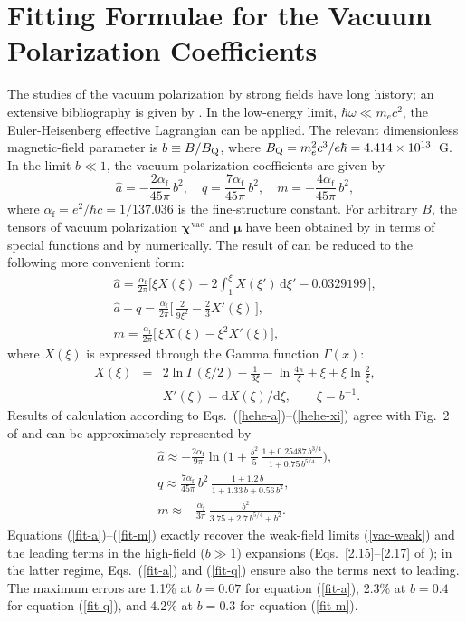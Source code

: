 \documentclass{emulateapj}
\newcommand{\beq}{\begin{equation}}
\newcommand{\eeq}{\end{equation}}
\newcommand{\bea}{\begin{eqnarray}}
\newcommand{\eea}{\end{eqnarray}}
\newcommand{\req}[1]{equation (\ref{#1})}
\newcommand{\dd}{\mathrm{d}}
\newcommand{\alphaf}{\alpha_\mathrm{f}}
\newcommand{\mel}{m_e}
\newcommand{\Bq}{B_{\rm Q}}
\begin{document}
\section{Fitting Formulae for the Vacuum Polarization Coefficients}
The studies of the vacuum polarization by strong fields have long
history; an extensive bibliography is given by \citet{Schubert}. In the
low-energy limit, $\hbar\omega\ll\mel c^2$, 
the Euler-Heisenberg effective Lagrangian can be
applied. The relevant dimensionless magnetic-field parameter is
 $b\equiv B/\Bq$, where $\Bq=\mel^2c^3/e\hbar=4.414\times 10^{13}$~G. 
In the limit 
$b\ll 1$, the vacuum polarization coefficients are given by 
\citep{Adler}
\beq
 \hat{a}= - \frac{2 \alphaf}{45\pi}\, b^2,
\quad
 q= \frac{7 \alphaf}{45\pi}\, b^2,
\quad
 m= - \frac{4 \alphaf}{45\pi}\, b^2,
\label{vac-weak}
\eeq
where $\alphaf=e^2/\hbar c = 1/137.036$ is the fine-structure constant.
For arbitrary $B$, the tensors of vacuum polarization
 $\bm{\chi}^\mathrm{vac}$ and $\bm{\mu}$
have been obtained by \citet{hehe} in terms of special functions
and by \citet{kohriyam} numerically. The result of \citet{hehe}
can be reduced to the following more convenient form:
\bea
&&
 \hat{a} = \frac{\alphaf}{2\pi} \bigg[
 \xi X(\xi) - 2 \int_1^\xi X(\xi')\, \dd \xi' - 0.0329199 \,\bigg],
\label{hehe-a}
\\&&
 \hat{a} + q = \frac{\alphaf}{2\pi} \bigg[\,
 \frac{2}{9\xi^2} -\frac23 X'(\xi) \,\bigg],
\label{hehe-q}
\\&&
 m = \frac{\alphaf}{2\pi} \Big[\,
 \xi X(\xi) - \xi^2 X'(\xi) \Big],
\label{hehe-m}
\eea
where $X(\xi)$ is expressed through the Gamma function $\Gamma(x)$:
\bea
 X(\xi) &=& 2 \ln \Gamma(\xi/2) - \frac{1}{3\xi}
 - \ln \frac{4\pi}{\xi} 
 + \xi + \xi \ln \frac{2}{\xi},
\\&&
 X'(\xi) = \dd X(\xi)/\dd\xi,
 \qquad 
 \xi = b^{-1}.
\label{hehe-xi}
\eea
Results of
calculation according to Eqs.~(\ref{hehe-a})--(\ref{hehe-xi})
agree with Fig.~2 of \citet{kohriyam} and can be
approximately represented by 
\bea
&&
 \hat{a} \approx - \frac{2\alphaf}{9\pi} \ln\bigg(
 1 + \frac{b^2}{5}\,\frac{
  1+0.25487\,b^{3/4}
  }{
  1+0.75\,b^{5/4}}\bigg),
\label{fit-a}
\\&&
 q \approx \frac{7\alphaf}{45\pi}\,b^2\,\frac{
 1 + 1.2\,b
 }{
 1 + 1.33\,b + 0.56\,b^2
 },
\label{fit-q}
\\&&
 m \approx - \frac{\alphaf}{3\pi} \, \frac{ b^2 }{
 3.75 + 2.7\,b^{5/4} + b^2 }.
\label{fit-m}
\eea
Equations (\ref{fit-a})--(\ref{fit-m}) exactly recover the weak-field
limits (\ref{vac-weak}) and the leading terms in 
the high-field ($b\gg1$) expansions 
(Eqs.\ [2.15]--[2.17] of \citealt{HoLai02});
in the latter regime, 
Eqs.\ (\ref{fit-a}) and (\ref{fit-q}) ensure also the 
terms next to leading. The maximum errors
are 1.1\% at $b=0.07$ for \req{fit-a}, 2.3\% at $b=0.4$ for \req{fit-q},
and 4.2\% at $b=0.3$ for \req{fit-m}.
\end{document}
